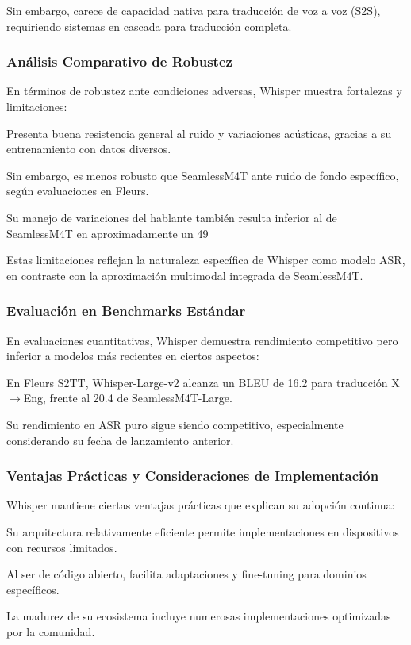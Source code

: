 Sin embargo, carece de capacidad nativa para traducción de voz a voz (S2S), requiriendo sistemas en cascada para traducción completa.

\subsubsection{Análisis Comparativo de Robustez}
En términos de robustez ante condiciones adversas, Whisper muestra fortalezas y limitaciones:

Presenta buena resistencia general al ruido y variaciones acústicas, gracias a su entrenamiento con datos diversos.

Sin embargo, es menos robusto que SeamlessM4T ante ruido de fondo específico, según evaluaciones en Fleurs.

Su manejo de variaciones del hablante también resulta inferior al de SeamlessM4T en aproximadamente un 49%

Estas limitaciones reflejan la naturaleza específica de Whisper como modelo ASR, en contraste con la aproximación multimodal integrada de SeamlessM4T.

\subsubsection{Evaluación en Benchmarks Estándar}
En evaluaciones cuantitativas, Whisper demuestra rendimiento competitivo pero inferior a modelos más recientes en ciertos aspectos:

En Fleurs S2TT, Whisper-Large-v2 alcanza un BLEU de 16.2 para traducción X$\rightarrow$Eng, frente al 20.4 de SeamlessM4T-Large.

Su rendimiento en ASR puro sigue siendo competitivo, especialmente considerando su fecha de lanzamiento anterior.

\subsubsection{Ventajas Prácticas y Consideraciones de Implementación}
Whisper mantiene ciertas ventajas prácticas que explican su adopción continua:

Su arquitectura relativamente eficiente permite implementaciones en dispositivos con recursos limitados.

Al ser de código abierto, facilita adaptaciones y fine-tuning para dominios específicos.

La madurez de su ecosistema incluye numerosas implementaciones optimizadas por la comunidad.

